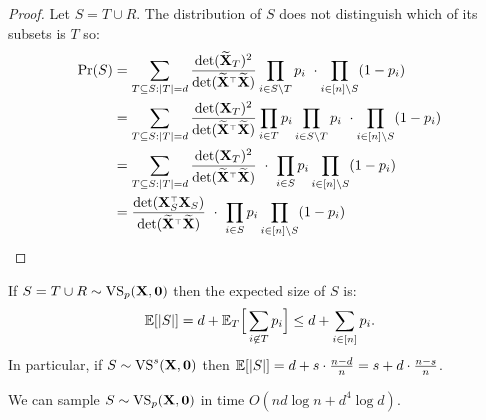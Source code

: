 \documentclass[12pt]{sty/colt2019/colt2018-arxiv}
\begin{document}
\begin{proof}
  Let $S=T\cup R$. The distribution of $S$ does not
  distinguish which of its subsets is $T$ so:
  \begin{align*}
    \Pr(S) &= \sum_{T\subseteq S: |T|=d}\frac{\det(\Xt_T)^2}{\det(\Xt^\top\Xt)}\prod_{i\in
    S\backslash T} p_i\ \cdot \prod_{i\in[n]\backslash S}(1-p_i)
\\ &=\sum_{T\subseteq S: |T|=d}\frac{\det(\X_T)^2}{\det(\Xt^\top\Xt)}\prod_{i\in T}p_i\prod_{i\in
    S\backslash T} p_i\ \cdot \prod_{i\in[n]\backslash S}(1-p_i)
\\ &=\sum_{T\subseteq S: |T|=d}\frac{\det(\X_T)^2}{\det(\Xt^\top\Xt)}\ \cdot\ \prod_{i\in
     S} p_i \prod_{i\in[n]\backslash S}(1-p_i)
\\ &=\frac{\det(\X_S^\top\X_S)}{\det(\Xt^\top\Xt)}\ \cdot\ \prod_{i\in
     S} p_i \prod_{i\in[n]\backslash S}(1-p_i)
  \end{align*}
\end{proof}
\begin{remark}
  If $S=T\cup R \sim {\mathrm{VS}}_p(\mathbf X,\mathbf 0)$ then the expected size of $S$ is:
  \begin{align*}
    \mathbb E[|S|] = d + \mathbb E_T\Big[\sum_{i\not \in T}p_i\Big]\leq d +
    \sum_{i\in[n]}p_i.
  \end{align*}
In particular, if $S\sim {\mathrm{VS}}^s(\mathbf X,\mathbf 0)$ then $\mathbb E[|S|] = d + s\cdot
\frac{n-d}n = s + d\cdot \frac{n-s}{n}$.  
\end{remark}
\begin{corollary}
  We can sample $S\sim {\mathrm{VS}}_p(\mathbf X,\mathbf 0)$ in time $O(nd\log n + d^4\log d)$.
\end{corollary}
\vspace{5mm}

\end{document}
